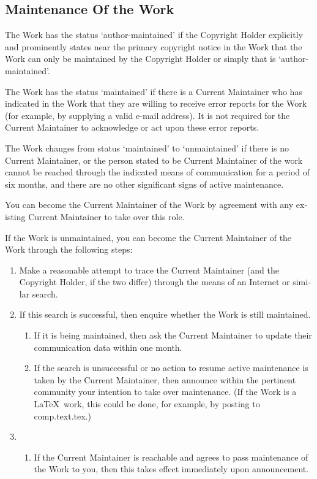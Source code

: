 \begin{otherlanguage}{english}
\section{Maintenance Of the Work}

The Work has the status `author-maintained' if the Copyright Holder
explicitly and prominently states near the primary copyright notice in
the Work that the Work can only be maintained by the Copyright Holder
or simply that is `author-maintained'.

The Work has the status `maintained' if there is a Current Maintainer
who has indicated in the Work that they are willing to receive error
reports for the Work (for example, by supplying a valid e-mail
address). It is not required for the Current Maintainer to acknowledge
or act upon these error reports.

The Work changes from status `maintained' to `unmaintained' if there
is no Current Maintainer, or the person stated to be Current
Maintainer of the work cannot be reached through the indicated means
of communication for a period of six months, and there are no other
significant signs of active maintenance.

You can become the Current Maintainer of the Work by agreement with
any existing Current Maintainer to take over this role.

If the Work is unmaintained, you can become the Current Maintainer of
the Work through the following steps:
\begin{enumerate}
 \item  Make a reasonable attempt to trace the Current Maintainer (and
     the Copyright Holder, if the two differ) through the means of
     an Internet or similar search.

 \item  If this search is successful, then enquire whether the Work
     is still maintained.
    \begin {enumerate}
  \item If it is being maintained, then ask the Current Maintainer
     to update their communication data within one month.

  \item  If the search is unsuccessful or no action to resume active
     maintenance is taken by the Current Maintainer, then announce
     within the pertinent community your intention to take over
     maintenance.  (If the Work is a \LaTeX\ work, this could be
     done, for example, by posting to comp.text.tex.)
    \end{enumerate}
\item \begin{enumerate}\item If the Current Maintainer is reachable and agrees to pass
     maintenance of the Work to you, then this takes effect
     immediately upon announcement.


\end{enumerate}
\end{enumerate}
\end{otherlanguage}
